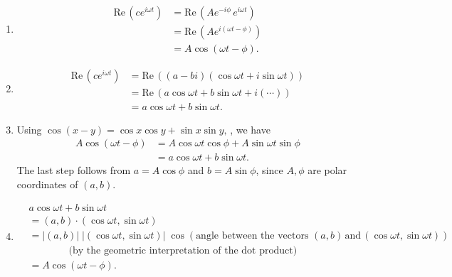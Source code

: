 \Proofs \\
\begin{enumerate}
\item
  \begin{align*}
    \displaystyle  \mathrm{Re\, }\left(c e^{i\omega t} \right)
    & \displaystyle = \mathrm{Re\, }\left(A e^{-i \phi } \,  e^{i\omega t} \right) \\
    & \displaystyle = \mathrm{Re\, }\left( A e^{i(\omega t - \phi )} \right) \\
    & \displaystyle = A \cos (\omega t - \phi ).
  \end{align*}
\item
  \begin{align*}
    \displaystyle  \mathrm{Re\, }\left(c e^{i\omega t} \right)
    & \displaystyle = \mathrm{Re\, }\left( (a-bi) (\cos \omega t + i \sin \omega t) \right) \\
    & \displaystyle = \mathrm{Re\, }\left(a \cos \omega t + b \sin \omega t + i(\cdots ) \right) \\
    & \displaystyle = a \cos \omega t + b \sin \omega t.
  \end{align*}
\item Using $\cos (x-y)=\cos x \cos y + \sin x \sin y,\,$, we have
  \begin{align*}
    \displaystyle  A \cos (\omega t - \phi )
    & \displaystyle = A \cos \omega t \cos \phi + A \sin \omega t \sin \phi \\
    & \displaystyle = a \cos \omega t + b \sin \omega t.
  \end{align*}
  The last step follows from $ a = A \cos \phi$ and $b = A \sin \phi$, since
  $A, \phi$ are polar coordinates of $(a,b)$.
\item
  \begin{align*}
    &\displaystyle a \cos \omega t + b \sin \omega t \\
    &\displaystyle = (a,b) \cdot (\cos \omega t,\sin \omega t) \\
    &\displaystyle = |(a,b)| \;  |(\cos \omega t,\sin \omega t)| \;
     \cos \left(\text {angle between the vectors } (a,b) \,
     \text {and}\,  (\cos \omega t,\sin \omega t)\right) \\
    &\displaystyle \qquad \qquad (\text {by the geometric interpretation of the dot product)} \\
    &\displaystyle = A \cos (\omega t - \phi ).
  \end{align*}
\end{enumerate}
\clearpage

